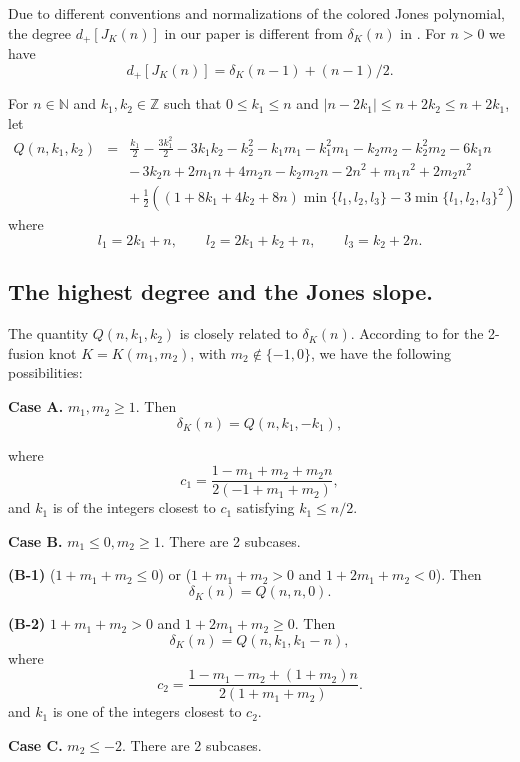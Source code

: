 \documentclass[11pt]{amsart}
\numberwithin{equation}{section}
\theoremstyle{plain}
\theoremstyle{definition}
\def\BN{\mathbb N}
\def\BZ{\mathbb Z}
\begin{document}
Due to different conventions and normalizations of the colored Jones polynomial, the degree $d_+[J_K(n)]$ in our paper is different from $\delta_K(n)$ in \cite{GV}. For $n>0$ we have $$d_+[J_K(n)] =  \delta_K(n-1) + (n-1)/2.$$



For $n \in \BN$ and $k_1, k_2 \in \BZ$ such that $0 \le k_1 \le n$ and $|n-2k_1| \le n+2k_2 \le n+2k_1$, let
\begin{eqnarray*}
Q(n,k_1,k_2)&=& \frac{k_1}{2} - \frac{3 k_1^2}{2} - 3 k_1 k_2 - k_2^2 - k_1 m_1 - k_1^2 m_1 - k_2 m_2 - k_2^2 m_2 - 6 k_1 n \\ 
& & - \, 3 k_2 n + 2 m_1 n + 4 m_2 n - k_2 m_2 n - 2 n^2 + m_1 n^2 + 2 m_2 n^2 \\ 
& & + \, \frac{1}{2} \left( (1 + 8 k_1 + 4 k_2 + 8 n) \min\{l_1,l_2,l_3\} - 3 \min\{l_1,l_2,l_3\}^2\right)
\end{eqnarray*}
where
$$
l_1=2 k_1 + n, \qquad l_2=2 k_1 + k_2 + n, \qquad l_3=k_2 + 2 n.
$$

\subsection{ The highest degree and the Jones slope.} The quantity  $Q(n,k_1,k_2)$ is closely related
to $\delta_K(n)$. According to \cite{GV}  for the 2-fusion knot $K=K(m_1,m_2)$, with $m_2 \notin \{-1, 0\}$, we have the following possibilities:
\vskip 0.04in


\textbf{Case A.} $m_1, m_2 \ge 1$. Then
$$\delta_K(n) = Q(n,k_1,-k_1),$$

\noindent where $$c_1=\frac{1 - m_1 + m_2 + m_2 n}{2 (-1 + m_1 + m_2)},$$ 
and  $k_1$ is of the integers closest to $c_1$ satisfying $k_1 \le n/2$. 

\vskip 0.04in

\textbf{Case B.} $m_1 \le 0, m_2 \ge 1$. There are 2 subcases.

\textbf{(B-1)} ($1 + m_1 + m_2 \le 0$) or ($1 + m_1 + m_2 > 0$ and $1 + 2m_1 + m_2 < 0$). Then
$$\delta_K(n) = Q(n,n,0).$$

\textbf{(B-2)} $1 + m_1 + m_2 > 0$ and $1 + 2m_1 + m_2 \ge 0$. 
 Then
$$\delta_K(n) = Q(n,k_1,k_1-n),$$
\noindent where  $$c_2=\frac{1 - m_1 - m_2 + (1 + m_2) n}{2 (1 + m_1 + m_2)}.$$
and $k_1$ is one of the integers closest to $c_2$.

\textbf{Case C.} $m_2 \le -2$. There are 2 subcases.
\end{document}
